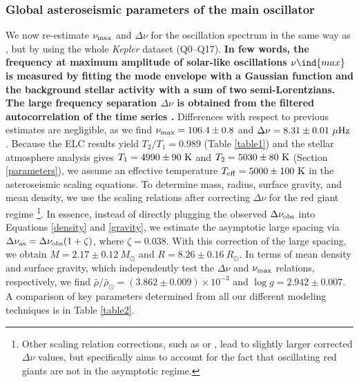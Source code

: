 \subsubsection{Global asteroseismic parameters of the main oscillator}
\label{subsubsec_main_osc}
We now re-estimate $\nu_{\rm{max}}$ and $\Delta \nu$ for the oscillation spectrum in the same way as \citet{gau14}, but by using the whole \textit{Kepler} dataset (Q0--Q17). \textbf{In few words, the frequency at maximum amplitude of solar-like oscillations $\nu\ind{max}$ is measured by fitting the mode envelope with a Gaussian function and the background stellar activity with a sum of two semi-Lorentzians. The large frequency separation $\Delta\nu$ is obtained from the filtered autocorrelation of the time series \citep{Mosser_Appourchaux_2009}.} Differences with respect to previous estimates are negligible, as we find $\nu_{\rm{max}} = 106.4 \pm 0.8$ and $\Delta \nu = 8.31 \pm 0.01 \ \mu \rm{Hz}$. Because the ELC results yield $T_2/T_1=0.989$ (Table \ref{table1}) and the stellar atmosphere analysis gives $T_1 = 4990 \pm 90 \ \rm{K}$ and $T_2 = 5030 \pm 80 \ \rm{K}$ (Section \ref{parameters}), we assume an effective temperature $T_{\rm{eff}} = 5000 \pm 100 \ \rm{K}$ in the asteroseismic scaling equations. To determine mass, radius, surface gravity, and mean density, we use the scaling relations after correcting $\Delta \nu$ for the red giant regime \citep{mos13}\footnote{Other scaling relation corrections, such as \citet{cha11} or \citet{kal10}, lead to slightly larger corrected $\Delta \nu$ values, but \citet{mos13} specifically aims to account for the fact that oscillating red giants are not in the asymptotic regime.}. In essence, instead of directly plugging the observed $\Delta \nu_{\rm{obs}}$ into Equations \ref{density} and \ref{gravity}, we estimate the asymptotic large spacing via $\Delta \nu_{\rm{as}} = \Delta \nu_{\rm{obs}} (1 + \zeta)$, where $\zeta = 0.038$. With this correction of the large spacing, we obtain $M = 2.17 \pm 0.12 \ M_{\odot}$ and $R = 8.26 \pm 0.16 \ R_{\odot}$. In terms of mean density and surface gravity, which independently test the $\Delta \nu$  and $\nu_{\rm{max}}$ relations, respectively, we find $\bar{\rho}/\bar{\rho}_{\odot} = (3.862 \pm 0.009) \times 10 ^{-3}$ and $\log g = 2.942 \pm 0.007$. A comparison of key parameters determined from all our different modeling techniques is in Table \ref{table2}.

